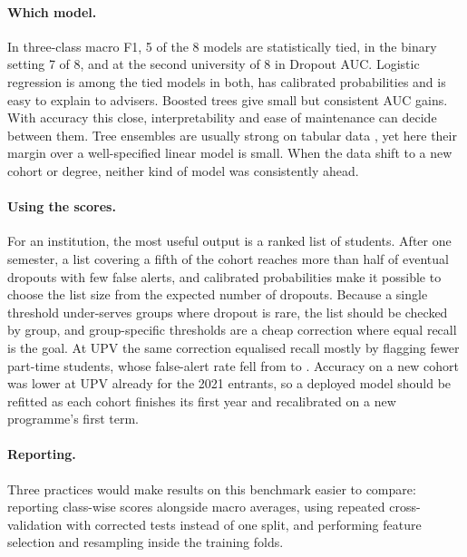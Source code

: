 \documentclass[11pt,a4paper]{article}
\begin{document}
\paragraph{Which model.} In three-class macro F1, 5 of the 8 models are statistically tied, in the binary setting 7 of 8, and at the second university \upvSemoneTied{} of 8 in Dropout AUC. Logistic regression is among the tied models in both, has calibrated probabilities and is easy to explain to advisers. Boosted trees give small but consistent AUC gains. With accuracy this close, interpretability and ease of maintenance can decide between them. Tree ensembles are usually strong on tabular data \citep{grinsztajn2022}, yet here their margin over a well-specified linear model is small. When the data shift to a new cohort or degree, neither kind of model was consistently ahead.

\paragraph{Using the scores.} For an institution, the most useful output is a ranked list of students. After one semester, a list covering a fifth of the cohort reaches more than half of eventual dropouts with few false alerts, and calibrated probabilities make it possible to choose the list size from the expected number of dropouts. Because a single threshold under-serves groups where dropout is rare, the list should be checked by group, and group-specific thresholds are a cheap correction where equal recall is the goal. At UPV the same correction equalised recall mostly by flagging fewer part-time students, whose false-alert rate fell from \upvThrYearParttimeSingleFpr{} to \upvThrYearParttimeGroupFpr. Accuracy on a new cohort was lower at UPV already for the 2021 entrants, so a deployed model should be refitted as each cohort finishes its first year and recalibrated on a new programme's first term.

\paragraph{Reporting.} Three practices would make results on this benchmark easier to compare: reporting class-wise scores alongside macro averages, using repeated cross-validation with corrected tests instead of one split, and performing feature selection and resampling inside the training folds.
\end{document}
